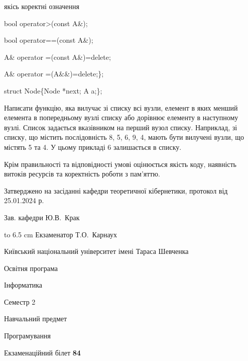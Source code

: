 \documentclass[12pt, ukrainian]{article}
\begin{document}
{\quad  якісь коректні означення 

\quad  bool operator>(const A\&); 

\quad  bool operator==(const A\&); 

\quad A\& operator =(const A\&)=delete; 

\quad  A\& operator =(A\&\&)=delete;\};

struct Node\{Node *next; A a;\};

 Написати функцію, яка вилучає зі списку всі вузли, елемент в яких менший елемента в попередньому вузлі списку або дорівнює елементу в наступному вузлі. Список задається вказівником на перший вузол списку. Наприклад, зі списку, що містить послідовність 8, 5, 6, 9, 4, мають бути вилучені вузли, що містять 5 та 4. У цьому прикладі 6 залишається в списку.

Крім правильності та відповідності умові оцінюється якість коду, наявність витоків ресурсів та коректність роботи з пам'яттю. 

}
{\smallskip\smallskip \begin {scriptsize} Затверджено на засіданні кафедри теоретичної кібернетики, протокол   від   25.01.2024 р.\par\smallskip\smallskip\smallskip\smallskip
{\parbox {6.5 cm} {Зав. кафедри \dotfill Ю.В.~Крак}}\hspace {0.7cm} {\hbox to 6.5 cm { Екзаменатор \dotfill Т.О.~Карнаух}} \end{scriptsize}}
\newpage
{{\begin {scriptsize}\par
{ \center  Київський національний університет імені Тараса Шевченка \par}
{\parbox {5 cm}{Освітня програма \hfill}{\parbox {7 cm}{Інформатика\hfill}}\parbox {6 cm}{\hfill Семестр 2}}\par
{\parbox {5 cm} {Навчальний предмет \hfill}\parbox {7 cm}{Програмування \hfill}\parbox {6cm}{\hfill}\par}\vspace{-15pt} \end{scriptsize}}{\center Екзаменаційний білет \No \textbf { 84 }\par}}
\end{document}
